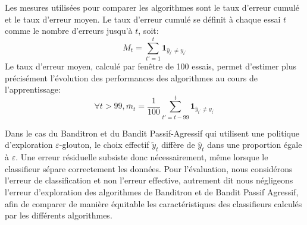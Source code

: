 \documentclass[preprint,12pt,authoryear]{elsarticle}
\begin{document}
Les mesures utilisées pour comparer les algorithmes sont le taux d'erreur cumulé et le taux d'erreur moyen. Le taux d'erreur cumulé se définit à chaque essai $t$ comme le nombre d'erreurs jusqu'à $t$, soit:
$$M_t = \sum_{t'=1}^t \mathbf{1}_{\hat{y}_{t^\prime}\neq y_{t^\prime}} $$
Le taux d'erreur moyen, calculé par fenêtre de 100 essais, permet d'estimer plus précisément l'évolution des performances des algorithmes au cours de l'apprentissage:
$$\forall t>99, \bar{m}_t = \frac{1}{100} \sum_{t'=t - 99}^t \mathbf{1}_{\hat{y}_{t^\prime}\neq y_{t^\prime}}$$

Dans le cas du Banditron et du Bandit Passif-Agressif qui utilisent une politique d'exploration $\varepsilon$-glouton, le choix effectif $\tilde{y}_t$ diffère de $\hat{y}_t$ dans une proportion égale à $\varepsilon$. Une erreur résiduelle subsiste donc nécessairement, même lorsque le classifieur sépare correctement les données. Pour l'évaluation, nous considérons l'erreur de classification et non l'erreur effective, autrement dit nous négligeons l'erreur d'exploration des algorithmes de Banditron et de Bandit Passif Agressif, afin de comparer de manière équitable les caractéristiques des classifieurs calculés par les différents algorithmes.
\end{document}
